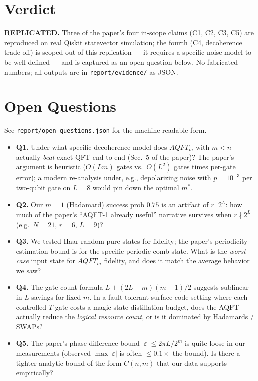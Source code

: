 \documentclass[11pt]{article}
\begin{document}
\section{Verdict}
\textbf{REPLICATED.}
Three of the paper's four in-scope claims (C1, C2, C3, C5) are reproduced
on real Qiskit statevector simulation; the fourth (C4, decoherence
trade-off) is scoped out of this replication --- it requires a specific
noise model to be well-defined --- and is captured as an open question below.
No fabricated numbers; all outputs are in \texttt{report/evidence/}
as JSON.

\section*{Open Questions}
See \texttt{report/open\_questions.json} for the machine-readable form.
\begin{itemize}
\item \textbf{Q1.} Under what specific decoherence model does $AQFT_m$
with $m<n$ actually \emph{beat} exact QFT end-to-end (Sec.~5 of the paper)?
The paper's argument is heuristic ($O(Lm)$ gates vs.\ $O(L^2)$ gates times
per-gate error); a modern re-analysis under, e.g., depolarizing noise with
$p=10^{-3}$ per two-qubit gate on $L=8$ would pin down the optimal $m^\ast$.
\item \textbf{Q2.} Our $m=1$ (Hadamard) success prob $0.75$ is an
artifact of $r\,|\,2^L$: how much of the paper's ``AQFT-1 already useful''
narrative survives when $r\nmid 2^L$ (e.g.\ $N=21$, $r=6$, $L=9$)?
\item \textbf{Q3.} We tested Haar-random pure states for fidelity; the
paper's periodicity-estimation bound is for the specific periodic-comb
state. What is the \emph{worst-case} input state for $AQFT_m$ fidelity,
and does it match the average behavior we saw?
\item \textbf{Q4.} The gate-count formula $L + (2L-m)(m-1)/2$ suggests
sublinear-in-$L$ savings for fixed $m$. In a fault-tolerant surface-code
setting where each controlled-$T$-gate costs a magic-state distillation
budget, does the AQFT actually reduce the \emph{logical resource count},
or is it dominated by Hadamards / SWAPs?
\item \textbf{Q5.} The paper's phase-difference bound $|\varepsilon|\le 2\pi L/2^m$
is quite loose in our measurements (observed $\max|\varepsilon|$ is often
$\le 0.1\times$ the bound). Is there a tighter analytic bound of the form
$C(n,m)$ that our data supports empirically?
\end{itemize}
\end{document}
